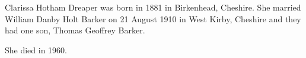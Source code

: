 
Clarissa Hotham Dreaper was born in 1881 in Birkenhead, Cheshire.
She married William Danby Holt Barker on 21 August 1910 in West Kirby, Cheshire and they had one son, Thomas Geoffrey Barker.

She died in 1960.
